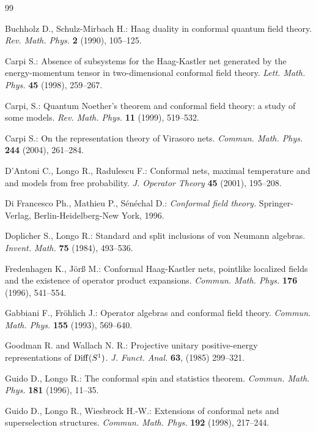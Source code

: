 \documentclass[12pt]{article}
\begin{document}
\medskip

\begin{thebibliography}{99}

                                                                                
 Buchholz D., Schulz-Mirbach H.: Haag duality in conformal
quantum field theory. {\it Rev. Math. Phys.} {\bf 2} (1990), 105--125.

 Carpi S.:                                                    
Absence of subsystems for the Haag-Kastler net generated by
the energy-momentum tensor in two-dimensional conformal field theory.
{\it Lett. Math. Phys.} {\bf 45} (1998), 259--267.

 Carpi, S.:
Quantum Noether's theorem and conformal field
theory: a study of some models.
{\it Rev. Math. Phys.}
{\bf 11} (1999), 519--532.

 Carpi S.: On the representation theory of Virasoro 
nets. {\it Commun. Math. Phys.} {\bf 244} (2004), 261--284.  

 D'Antoni C., Longo R., Radulescu F.: Conformal nets, 
maximal temperature and and models from free probability. 
{\it J. Operator Theory} {\bf 45} (2001), 195--208.  
 
 Di Francesco Ph., Mathieu P., S\'en\'echal D.: {\it
 Conformal field theory.} Springer-Verlag, Berlin-Heidelberg-New York, 
1996.

 Doplicher S., Longo R.:
Standard and split inclusions of von Neumann algebras.
{\it Invent. Math.}
{\bf 75} (1984), 493--536.

 Fredenhagen K., J\"{o}r{\ss} M.: Conformal
Haag-Kastler nets, pointlike localized fields and the
existence of operator product expansions. {\it Commun. Math. Phys.} 
{\bf 176} (1996), 541--554.

 Gabbiani F., Fr\"{o}hlich J.: Operator algebras and
conformal field theory. {\it Commun. Math. Phys.} {\bf 155} (1993), 
569--640.

 Goodman R. and Wallach N. R.: Projective unitary 
positive-energy representations of ${\rm Diff}(\s1)$. 
{\it J. Funct. Anal.} {\bf 63}, (1985) 299--321.

 Guido D., Longo R.: The conformal spin and statistics 
theorem. {\it Commun. Math. Phys.} {\bf 181} (1996), 11--35.

 Guido D., Longo R., Wiesbrock H.-W.: Extensions of
conformal nets and superselection structures. 
{\it Commun. Math. Phys.} {\bf 192} (1998), 217--244. 


\end{thebibliography}
\end{document}
